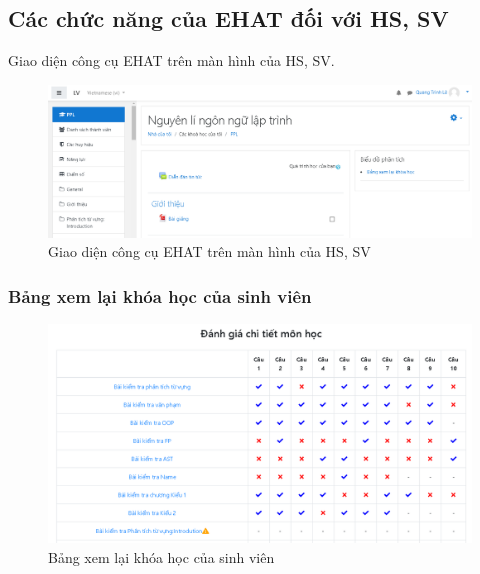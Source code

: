 \newpage
\subsection{Các chức năng của EHAT đối với HS, SV}

Giao diện công cụ EHAT trên màn hình của HS, SV.

\begin{center}
	\begin{figure}[htp]
		\begin{center}
			\includegraphics[width=1\linewidth]{img/32}
		\end{center}
		\caption{Giao diện công cụ EHAT trên màn hình của HS, SV}
		\label{refhinh64}
	\end{figure}
\end{center}

\subsubsection{Bảng xem lại khóa học của sinh viên}

\begin{center}
	\begin{figure}[htp]
		\begin{center}
			\includegraphics[width=1\linewidth]{img/33}
		\end{center}
		\caption{Bảng xem lại khóa học của sinh viên}
		\label{refhinh65}
	\end{figure}
\end{center}

